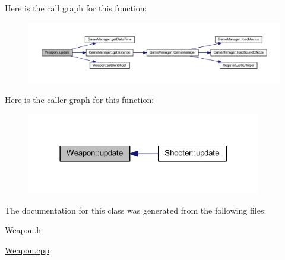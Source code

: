 Here is the call graph for this function:
\nopagebreak
\begin{figure}[H]
\begin{center}
\leavevmode
\includegraphics[width=400pt]{db/de5/class_weapon_a1b3f76c5275b67f0bb8073157a27e736_cgraph}
\end{center}
\end{figure}




Here is the caller graph for this function:
\nopagebreak
\begin{figure}[H]
\begin{center}
\leavevmode
\includegraphics[width=290pt]{db/de5/class_weapon_a1b3f76c5275b67f0bb8073157a27e736_icgraph}
\end{center}
\end{figure}




The documentation for this class was generated from the following files:\begin{DoxyCompactItemize}
\item 
\hyperlink{_weapon_8h}{Weapon.h}\item 
\hyperlink{_weapon_8cpp}{Weapon.cpp}\end{DoxyCompactItemize}
